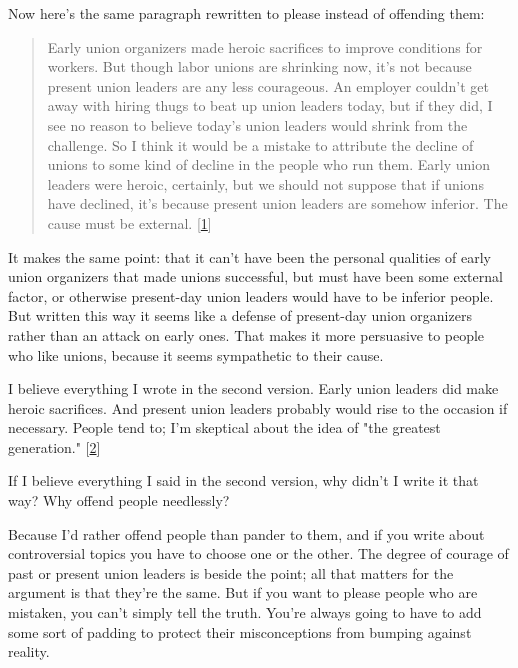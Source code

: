                   Now here's the same paragraph rewritten to please instead of
                  offending them:
                  \begin{quote}

                    Early union organizers made heroic sacrifices to improve
                    conditions for workers. But though labor unions are
                    shrinking now, it's not because present union leaders are
                    any less courageous. An employer couldn't get away with
                    hiring thugs to beat up union leaders today, but if they
                    did, I see no reason to believe today's union leaders would
                    shrink from the challenge. So I think it would be a mistake
                    to attribute the decline of unions to some kind of decline
                    in the people who run them. Early union leaders were heroic,
                    certainly, but we should not suppose that if unions have
                    declined, it's because present union leaders are somehow
                    inferior. The cause must be external.
                    [\href{\#f1n}{1}]
                  
\end{quote}

                  It makes the same point: that it can't have been the personal
                  qualities of early union organizers that made unions
                  successful, but must have been some external factor, or
                  otherwise present-day union leaders would have to be inferior
                  people. But written this way it seems like a defense of
                  present-day union organizers rather than an attack on early
                  ones. That makes it more persuasive to people who like unions,
                  because it seems sympathetic to their cause.

I
                  believe everything I wrote in the second version. Early union
                  leaders did make heroic sacrifices. And present union leaders
                  probably would rise to the occasion if necessary. People tend
                  to; I'm skeptical about the idea of "the greatest generation."
                  [\href{\#f2n}{2}]

If I believe everything I said in the second
                  version, why didn't I write it that way? Why offend people
                  needlessly?

Because I'd rather offend people than
                  pander to them, and if you write about controversial topics
                  you have to choose one or the other. The degree of courage of
                  past or present union leaders is beside the point; all that
                  matters for the argument is that they're the same. But if you
                  want to please people who are mistaken, you can't simply tell
                  the truth. You're always going to have to add some sort of
                  padding to protect their misconceptions from bumping against
                  reality.

